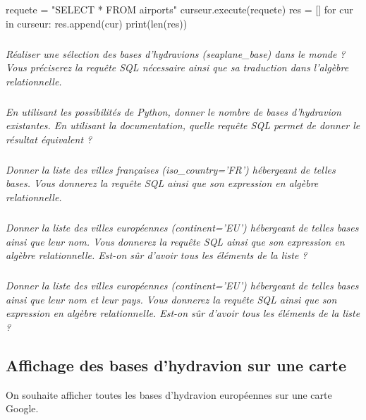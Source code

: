 \documentclass[10pt]{article}
\begin{document}
\begin{py}
\begin{python}
requete = "SELECT * FROM airports"
curseur.execute(requete)
res = []
for cur in curseur:
    res.append(cur)
print(len(res))
\end{python}
\end{py}

\subparagraph{}
\textit{Réaliser une sélection des bases d'hydravions (\textsf{seaplane\_base}) dans le monde ? Vous préciserez la requête SQL nécessaire ainsi que sa traduction dans l'algèbre relationnelle. }


\subparagraph{}
\textit{En utilisant les possibilités de Python, donner le nombre de bases d'hydravion existantes. En utilisant la documentation, quelle requête SQL permet de donner le résultat équivalent ?}

\subparagraph{}
\textit{Donner la liste des villes françaises (\textsl{iso\_country='FR'}) hébergeant de telles bases. Vous donnerez la requête SQL ainsi que son expression en algèbre relationnelle.}


\subparagraph{}
\textit{Donner la liste des villes européennes (\textsl{continent='EU'}) hébergeant de telles bases ainsi que leur nom. Vous donnerez la requête SQL ainsi que son expression en algèbre relationnelle. Est-on sûr d'avoir tous les éléments de la liste ?}


\subparagraph{}
\textit{Donner la liste des villes européennes (\textsl{continent='EU'}) hébergeant de telles bases ainsi que leur nom et leur pays. Vous donnerez la requête SQL ainsi que son expression en algèbre relationnelle. Est-on sûr d'avoir tous les éléments de la liste ?}


\subsection*{Affichage des bases d'hydravion sur une carte}
On souhaite afficher toutes les bases d'hydravion européennes sur une carte Google. 
\end{document}
